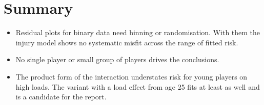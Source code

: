 \documentclass[12pt,notitlepage]{report}
\begin{document}
\section{Summary}

\begin{itemize}
  \item Residual plots for binary data need binning or randomisation. With
    them the injury model shows no systematic misfit across the range of
    fitted risk.
  \item No single player or small group of players drives the conclusions.
  \item The product form of the interaction understates risk for young
    players on high loads. The variant with a load effect from age 25 fits
    at least as well and is a candidate for the report.
\end{itemize}
\end{document}
